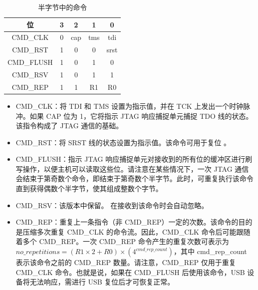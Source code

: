 \documentclass[main\_\_CN.tex]{subfiles}
\begin{document}
\begin{table}[H]
    \centering
    \caption{半字节中的命令}
    \label{tab:usbserialjtag-commands-of-a-nibble}
    
    \begin{tabular}{|c|c c c c|}
    \hline
        \rowcolor{lightgray}
        \textbf{位} & \textbf{3} & \textbf{2} & \textbf{1} & \textbf{0}
        \\\hline
        
        CMD\_CLK & 0 &  cap & tms & tdi \\\hline
        CMD\_RST & 1 & 0 & 0 & srst \\\hline
        CMD\_FLUSH & 1 & 0 & 1 & 0 \\\hline
        CMD\_RSV & 1 & 0 & 1 & 1 \\\hline
        CMD\_REP & 1 & 1 & R1 & R0 \\\hline
    \end{tabular}
\end{table}

\begin{itemize}
\item CMD\_CLK：将 TDI 和 TMS 设置为指示值，并在 TCK 上发出一个时钟脉冲。如果 CAP 位为 1，它将指示 JTAG 响应捕捉单元捕捉 TDO 线的状态。该指令构成了 JTAG 通信的基础。

\item CMD\_RST：将 SRST 线的状态设置为指示值。该命令可用于复位 \chipname{}。

\item CMD\_FLUSH：指示 JTAG 响应捕捉单元对接收到的所有位的缓冲区进行刷写操作，以便主机可以读取这些位。请注意在某些情况下，一次 JTAG 通信会结束于第奇数个命令，即结束于第奇数个半字节。此时，可重复执行该命令直到获得偶数个半字节，使其组成整数个字节。

\item CMD\_RSV：该版本中保留。\chipname{} 在接收到该命令时会自动忽略。

\item CMD\_REP：重复上一条指令（非 CMD\_REP）一定的次数。该命令的目的是压缩多次重复 CMD\_CLK 的命令流。因此，CMD\_CLK 命令后可能跟随着多个 CMD\_REP。一次 CMD\_REP 命令产生的重复次数可表示为 \begin{math}no\_repetitions = (R1 \times 2 + R0) \times (4^{cmd\_rep\_count})\end{math}，其中 cmd\_rep\_count 表示该命令之前的 CMD\_REP 数量。请注意，CMD\_REP 仅用于重复 CMD\_CLK 命令。也就是说，如果在 CMD\_FLUSH 后使用该命令，USB 设备将无法响应，需进行 USB 复位后才可恢复正常。
\end{itemize}
\end{document}
